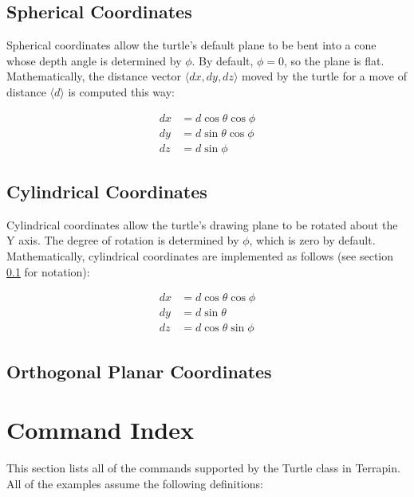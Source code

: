 \documentclass{article}
\begin{document}
    \subsection{Spherical Coordinates}
      \label{sec:z-spherical}
      \label{sec:spherical-coordinates}

      Spherical coordinates allow the turtle's default plane to be bent into a
      cone whose depth angle is determined by $\phi$. By default, $\phi=0$, so
      the plane is flat. Mathematically, the distance vector $\langle dx, dy,
      dz\rangle$ moved by the turtle for a move of distance $\langle d\rangle$
      is computed this way:

      \begin{align*}
	dx & = d \cos \theta \cos \phi \\
	dy & = d \sin \theta \cos \phi \\
	dz & = d \sin \phi
      \end{align*}

    \subsection{Cylindrical Coordinates}
      \label{sec:y-cylindrical}
      \label{sec:cylindrical-coordinates}

      Cylindrical coordinates allow the turtle's drawing plane to be rotated
      about the Y axis. The degree of rotation is determined by $\phi$, which is
      zero by default. Mathematically, cylindrical coordinates are implemented
      as follows (see section \ref{sec:z-spherical} for notation):

      \begin{align*}
	dx & = d \cos \theta \cos \phi \\
	dy & = d \sin \theta \\
	dz & = d \cos \theta \sin \phi
      \end{align*}

    \subsection{Orthogonal Planar Coordinates}
      \label{sec:orthogonal-planar}

  \section{Command Index}
    \label{sec:command-index}

    This section lists all of the commands supported by the Turtle class in
    Terrapin. All of the examples assume the following definitions:
\end{document}
